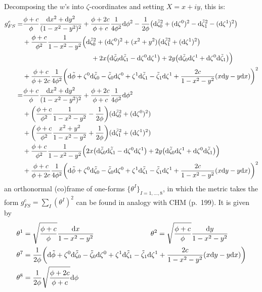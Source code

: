 \documentclass[parskip=half]{scrartcl}
\begin{document}
Decomposing the $w$'s into $\zeta$-coordinates and setting $X=x+iy$, this is:
\begin{align*}
	g_{FS}^c=&\frac{\phi+c}{\phi}\frac{\d x^2+\d y^2}{(1-x^2-y^2)^2} 
	+ \frac{\phi+2c}{\phi+c}\frac{1}{4\phi^2}\d \phi^2
	-\frac{1}{2\phi} \big(\d \tilde\zeta_0^2+ (\d \zeta^0)^2 - \d \tilde \zeta_1^2 - (\d \zeta^1)^2\big)\\
	&+\frac{\phi+c}{\phi^2}\frac{1}{1-x^2-y^2}\Big(\d \tilde\zeta_0^2+(\d \zeta^0)^2
	+(x^2+y^2)\big(\d \tilde\zeta_1^2+(\d \zeta^1)^2\big)\\
	&\hspace{3.6cm}+2x \big(\d \tilde\zeta_0\d \tilde\zeta_1 - \d \zeta^0 \d \zeta^1 \big) 
	+2y \big(\d \tilde\zeta_0 \d \zeta^1 + \d \zeta^0\d \tilde\zeta_1 \big) \Big)\\
	&+\frac{\phi+c}{\phi+2c}\frac{1}{4\phi^2}\bigg(\d \tilde{\phi}+\zeta^0 \d \tilde{\zeta}_0 -\tilde{\zeta}_0 \d \zeta^0
	+\zeta^1 \d \tilde{\zeta}_1 -\tilde{\zeta}_1 \d \zeta^1+\frac{2c}{1-x^2-y^2}(x\d y-y \d x)\bigg)^2\\
	=&\frac{\phi+c}{\phi}\frac{\d x^2+\d y^2}{(1-x^2-y^2)^2} 
	+ \frac{\phi+2c}{\phi+c}\frac{1}{4\phi^2}\d \phi^2\\
	&+\bigg(\frac{\phi+c}{\phi^2}\frac{1}{1-x^2-y^2}-\frac{1}{2\phi}\bigg) (\d \tilde\zeta_0^2+(\d \zeta^0)^2)\\
	&+\bigg(\frac{\phi+c}{\phi^2}\frac{x^2+y^2}{1-x^2-y^2}+\frac{1}{2\phi}\bigg) (\d \tilde\zeta_1^2+(\d \zeta^1)^2)\\
	&+\frac{\phi+c}{\phi^2}\frac{1}{1-x^2-y^2}
	\Big(2x \big(\d \tilde\zeta_0\d \tilde\zeta_1 - \d \zeta^0 \d \zeta^1 \big) 
	+2y \big(\d \tilde\zeta_0 \d \zeta^1 + \d \zeta^0\d \tilde\zeta_1 \big) \Big)\\
	&+\frac{\phi+c}{\phi+2c}\frac{1}{4\phi^2}\bigg(\d \tilde{\phi}+\zeta^0 \d \tilde{\zeta}_0 -\tilde{\zeta}_0 \d \zeta^0
	+\zeta^1 \d \tilde{\zeta}_1 -\tilde{\zeta}_1 \d \zeta^1+\frac{2c}{1-x^2-y^2}(x\d y-y \d x)\bigg)^2
\end{align*}
an orthonormal (co)frame of one-forms $\{\theta^I\}_{I=1,\dots,8}$, in which the metric takes the form $g^c_{FS}=\sum_I (\theta^I)^2$ can be found in analogy with CHM (p.~199). It is given by
\begin{align*}
	\theta^1&=\sqrt{\frac{\phi+c}{\phi}}\frac{\mathrm{d} x}{1-x^2-y^2}\qquad \qquad 
	\qquad \qquad \theta^2=\sqrt{\frac{\phi+c}{\phi}}\frac{\mathrm{d} y}{1-x^2-y^2}\\
	\theta^7&=\frac{1}{2\phi}\bigg(\mathrm{d} \tilde{\phi}+\zeta^0 \mathrm{d} \tilde{\zeta}_0 -\tilde{\zeta}_0 \mathrm{d} \zeta^0
	+\zeta^1 \mathrm{d} \tilde{\zeta}_1 -\tilde{\zeta}_1 \mathrm{d} \zeta^1
	+\frac{2c}{1-x^2-y^2}(x\mathrm{d} y-y \mathrm{d} x)\bigg)\\ 
	\theta^8&=\frac{1}{2\phi}\sqrt{\frac{\phi+2c}{\phi+c}}\mathrm{d} \phi\\
\end{align*}
\end{document}
